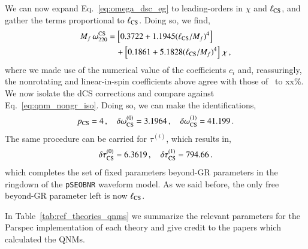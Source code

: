 \documentclass[twocolumn,prd,aps,superscriptaddress,preprintnumbers,tightenlines,showpacs,nofootinbib,eqsecnum,amsfonts,amsmath,longbibliography]{revtex4-1}
\newcommand{\Mf}{M_f}
\newcommand{\pSEOB}{\texttt{pSEOBNR}}
\begin{document}
We can now expand Eq.~\eqref{eq:omega_dsc_eg} to leading-orders in $\chi$ and $\ell_{\rm CS}$, and
gather the terms proportional to $\ell_{\rm CS}$.
%
Doing so, we find,
%
\begin{align}
    \Mf \, \omega^{\rm CS}_{220} &=
    \left[ 0.3722 + 1.1945 (\ell_{\rm CS} / \Mf)^4 \right]
    \nonumber \\
    &\quad + \left[0.1861 + 5.1828 (\ell_{\rm CS} / \Mf)^4 \right] \, \chi\,,
\end{align}
%
where we made use of the numerical value of the coefficients $c_{i}$ and,
reassuringly, the nonrotating and linear-in-spin coefficients above agree with those
of~\cite{Maselli:2019mjd} to xx\%.
%
We now isolate the dCS corrections and compare against Eq.~\eqref{eq:qnm_nongr_iso}.
%
Doing so, we can make the identifications,
%
\begin{equation}
p_{\rm CS} = 4\,, \quad \delta \omega^{(0)}_{\rm CS} = 3.1964\,, \quad \delta \omega^{(1)}_{\rm CS} = 41.199\,.
\label{eq:cs_omega_coefs}
\end{equation}
%
The same procedure can be carried for $\tau^{(i)}$, which results in,
%
\begin{equation}
\delta \tau^{(0)}_{\rm CS} = 6.3619\,, \quad \delta \tau^{(1)}_{\rm CS} = 794.66\,.
\label{eq:cs_tau_coefs}
\end{equation}
%
which completes the set of fixed parameters beyond-GR parameters in the ringdown of the \pSEOB{} waveform model.
%
As we said before, the only free beyond-GR parameter left is now $\ell_{\rm CS}$.

In Table~\ref{tab:ref_theories_qnms} we summarize the relevant parameters for
the {\sc Parspec} implementation of each theory and give credit to the papers
which calculated the QNMs.
\end{document}
